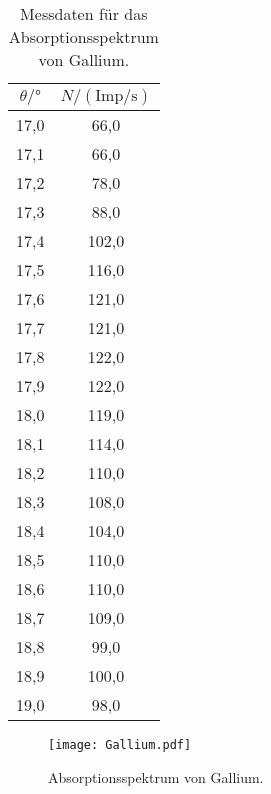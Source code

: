 \begin{table}[H]
    \centering
    \caption{Messdaten für das Absorptionsspektrum von Gallium.}
    \label{tab:Gallium}
    \begin{tabular}{|c| c|}
    \toprule
    $\theta/\mathrm{°}$ & $N/(\mathrm{Imp/s})$ \\
    \midrule
    17,0 &	66,0 \\
    17,1 &	66,0 \\
    17,2 &	78,0 \\
    17,3 &	88,0 \\
    17,4 &	102,0 \\
    17,5 &	116,0 \\
    17,6 &	121,0 \\
    17,7 &	121,0 \\
    17,8 &	122,0 \\
    17,9 &	122,0 \\
    18,0 &	119,0 \\
    18,1 &	114,0 \\
    18,2 &	110,0 \\
    18,3 &	108,0 \\
    18,4 &	104,0 \\
    18,5 &	110,0 \\
    18,6 &	110,0 \\
    18,7 &	109,0 \\
    18,8 &	99,0 \\
    18,9 &	100,0 \\
    19,0 &	98,0 \\
    \bottomrule
    \end{tabular}
\end{table}
\begin{figure}[H]
    \centering
    \texttt{[image: Gallium.pdf]}
    \caption{Absorptionsspektrum von Gallium.}
    \label{fig:Gallium}
  \end{figure}

